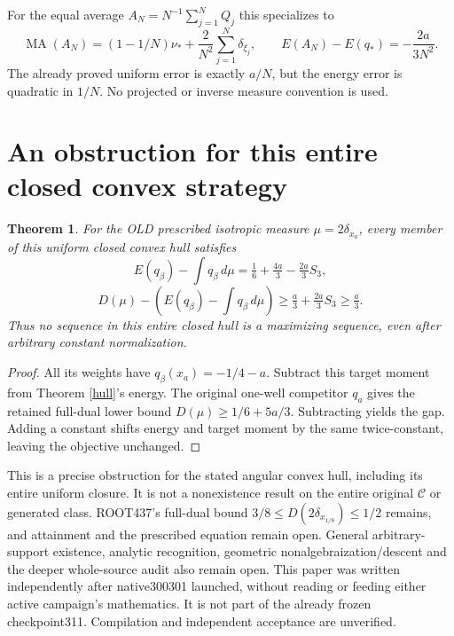 \documentclass[11pt]{article}
\newtheorem{theorem}{Theorem}
\newcommand{\MA}{\operatorname{MA}}
\newcommand{\C}{\mathcal C}
\begin{document}
For the equal average $A_N=N^{-1}\sum_{j=1}^NQ_j$ this specializes to
\[
 \MA(A_N)=(1-1/N)\nu_*+\frac2{N^2}\sum_{j=1}^N\delta_{\xi_j},
 \qquad E(A_N)-E(q_*)=-\frac{2a}{3N^2}.
\]
The already proved uniform error is exactly $a/N$, but the energy error
is quadratic in $1/N$. No projected or inverse measure convention is used.

\section{An obstruction for this entire closed convex strategy}
\begin{theorem}\label{gap}
For the OLD prescribed isotropic measure $\mu=2\delta_{x_a}$, every
member of this uniform closed convex hull satisfies
\[
 E(q_\beta)-\int q_\beta\,d\mu
 =\tfrac16+\tfrac{4a}3-\tfrac{2a}3S_3,
\]
\[
 D(\mu)-\left(E(q_\beta)-\int q_\beta\,d\mu\right)
 \ge\tfrac a3+\tfrac{2a}3S_3\ge\tfrac a3.
\]
Thus no sequence in this entire closed hull is a maximizing sequence,
even after arbitrary constant normalization.
\end{theorem}
\begin{proof}
All its weights have $q_\beta(x_a)=-1/4-a$. Subtract this target moment
from Theorem \ref{hull}'s energy. The original one-well competitor $q_a$
gives the retained full-dual lower bound $D(\mu)\ge1/6+5a/3$.
Subtracting yields the gap. Adding a constant shifts energy and target
moment by the same twice-constant, leaving the objective unchanged.
\end{proof}

This is a precise obstruction for the stated angular convex hull,
including its entire uniform closure. It is not a nonexistence result
on the entire original $\C$ or generated class. ROOT437's full-dual
bound $3/8\le D(2\delta_{x_{1/8}})\le1/2$ remains, and attainment and
the prescribed equation remain open. General arbitrary-support existence,
analytic recognition, geometric nonalgebraization/descent and the deeper
whole-source audit also remain open. This paper was written independently
after native300301 launched, without reading or feeding either active
campaign's mathematics. It is not part of the already frozen checkpoint311.
Compilation and independent acceptance are unverified.
\end{document}
